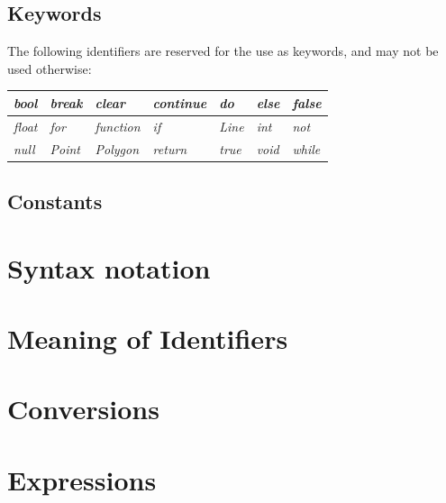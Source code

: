 \documentclass{l3proj}
\begin{document}
\subsection{Keywords}
The following identifiers are reserved for the use as keywords, and may not be used otherwise: 


\begin{center}
    \begin{tabular}{ | l | l | l | l | l |l|l|}
    \hline
    \textit{bool} & \textit{break} & \textit{clear} & \textit{continue}& \textit{do}  &  \textit{else} & \textit{false}\\
    \hline \textit{float} & \textit{for}& \textit{function} &
 
    \textit{if} & \textit{Line} & \textit{int} & \textit{not}\\ 
    \hline
    
    \textit{null} &
    \textit{Point} & \textit{Polygon} & \textit{return} & \textit{true}
     &
    \textit{void} & \textit{while} \\
    \hline

    \end{tabular}
\end{center}
\subsection{Constants}
\section{Syntax notation}
\section{Meaning of Identifiers} 
\section{Conversions}
\section{Expressions}
\end{document}
